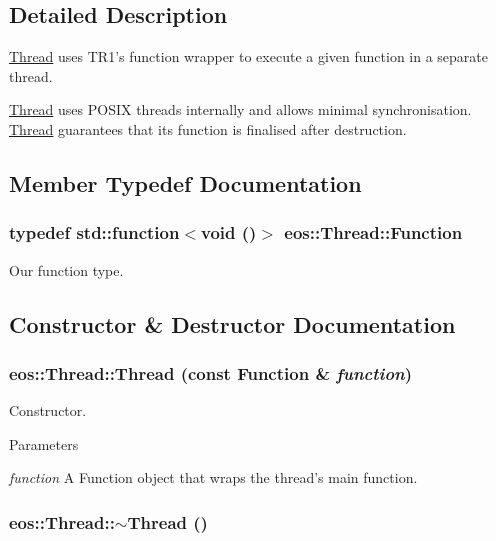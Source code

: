 \subsection{Detailed Description}
\hyperlink{classeos_1_1Thread}{Thread} uses TR1's function wrapper to execute a given function in a separate thread.

\hyperlink{classeos_1_1Thread}{Thread} uses POSIX threads internally and allows minimal synchronisation. \hyperlink{classeos_1_1Thread}{Thread} guarantees that its function is finalised after destruction. 

\subsection{Member Typedef Documentation}
\hypertarget{classeos_1_1Thread_a5056834a1e9dce530abf5adb90bb13ba}{
\subsubsection[{Function}]{\setlength{\rightskip}{0pt plus 5cm}typedef std::function$<$void ()$>$ {\bf eos::Thread::Function}}}
\label{classeos_1_1Thread_a5056834a1e9dce530abf5adb90bb13ba}


Our function type. 

\subsection{Constructor \& Destructor Documentation}
\hypertarget{classeos_1_1Thread_ad8d7a9a4d2275f21a42b80fbad67b172}{
\subsubsection[{Thread}]{\setlength{\rightskip}{0pt plus 5cm}eos::Thread::Thread (const {\bf Function} \& {\em function})}}
\label{classeos_1_1Thread_ad8d7a9a4d2275f21a42b80fbad67b172}
Constructor.


\begin{DoxyParams}{Parameters}
\item[{\em function}]A Function object that wraps the thread's main function. \end{DoxyParams}
\hypertarget{classeos_1_1Thread_af56391a1c255e3cc9cf754917776af39}{
\subsubsection[{$\sim$Thread}]{\setlength{\rightskip}{0pt plus 5cm}eos::Thread::$\sim$Thread ()}}
\label{classeos_1_1Thread_af56391a1c255e3cc9cf754917776af39}


